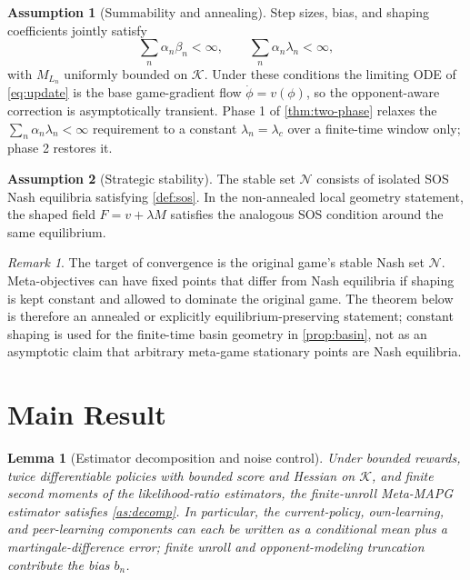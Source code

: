 \documentclass{article}
\theoremstyle{plain}
\newtheorem{lemma}[theorem]{Lemma}
\theoremstyle{definition}
\newtheorem{assumption}{Assumption}
\theoremstyle{remark}
\newtheorem{remark}[theorem]{Remark}
\newcommand{\K}{\mathcal{K}}
\newcommand{\N}{\mathcal{N}}
\begin{document}
\begin{assumption}[Summability and annealing]\label{as:anneal}
Step sizes, bias, and shaping coefficients jointly satisfy
\[
\sum_n\alpha_n\beta_n<\infty,\qquad
\sum_n\alpha_n\lambda_n<\infty,
\]
with $M_{L_n}$ uniformly bounded on $\K$. Under these conditions the limiting ODE of \eqref{eq:update} is the base game-gradient flow $\dot\phi=v(\phi)$, so the opponent-aware correction is asymptotically transient. Phase 1 of \cref{thm:two-phase} relaxes the $\sum_n\alpha_n\lambda_n<\infty$ requirement to a constant $\lambda_n=\lambda_c$ over a finite-time window only; phase 2 restores it.
\end{assumption}

\begin{assumption}[Strategic stability]\label{as:stable}
The stable set $\N$ consists of isolated SOS Nash equilibria satisfying \cref{def:sos}. In the non-annealed local geometry statement, the shaped field $F=v+\lambda M$ satisfies the analogous SOS condition around the same equilibrium.
\end{assumption}

\begin{remark}
The target of convergence is the original game's stable Nash set $\N$. Meta-objectives can have fixed points that differ from Nash equilibria if shaping is kept constant and allowed to dominate the original game. The theorem below is therefore an annealed or explicitly equilibrium-preserving statement; constant shaping is used for the finite-time basin geometry in \cref{prop:basin}, not as an asymptotic claim that arbitrary meta-game stationary points are Nash equilibria.
\end{remark}

\section{Main Result}\label{sec:main}

\begin{lemma}[Estimator decomposition and noise control]\label{lem:decomp}
Under bounded rewards, twice differentiable policies with bounded score and Hessian on $\K$, and finite second moments of the likelihood-ratio estimators, the finite-unroll Meta-MAPG estimator satisfies \cref{as:decomp}. In particular, the current-policy, own-learning, and peer-learning components can each be written as a conditional mean plus a martingale-difference error; finite unroll and opponent-modeling truncation contribute the bias $b_n$.
\end{lemma}
\end{document}
